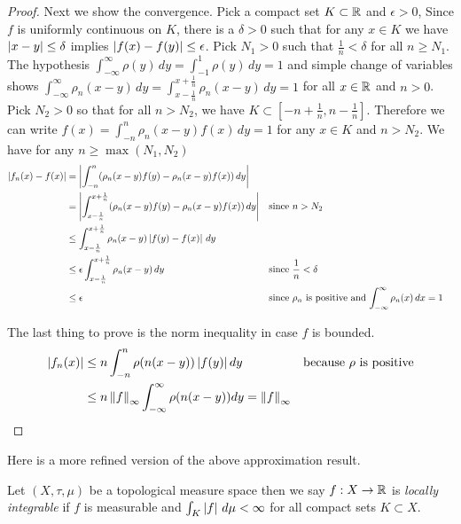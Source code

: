 \begin{proof}
Next we show the convergence.  Pick a compact set $K \subset \mathbb{R}$
and  $\epsilon > 0$,
Since $f$ is uniformly continuous on $K$,  there is a $\delta >0$ such
that for any $x \in K$ we have $\left \vert x - y \right \vert \leq \delta$ implies
$\left \vert f(x) - f(y) \right \vert \leq \epsilon$.  Pick $N_1 > 0$ such that
$\frac{1}{n} < \delta$ for all $n \geq N_1$.  The hypothesis $\int_{-\infty}^\infty
\rho(y) \, dy = \int_{-1}^1
\rho(y) \, dy = 1$ and simple change of variables shows $\int_{-\infty}^\infty
\rho_n(x - y) \, dy = \int_{x - \frac{1}{n}}^{x + \frac{1}{n}}
\rho_n(x - y) \, dy = 1$ for all $x \in \mathbb{R}$ and $n > 0$.  Pick $N_2>0$ so that for all $n > N_2$,
we have $K \subset [-n + \frac{1}{n}, n - \frac{1}{n}]$.  Therefore we can write $f(x) = \int_{- n}^{n}
\rho_n(x - y) f(x)  \, dy = 1$ for any $x \in K$ and $n > N_2$.  We
have for any $n \geq \max(N_1, N_2)$
\begin{align*}
\left \vert f_n(x) - f(x) \right \vert &= \left \vert \int_{- n}^{n} (\rho_n(x -
  y)f(y) -
\rho_n(x- y) f(x)) \, dy \right \vert \\
&= \left \vert \int_{x - \frac{1}{n}}^{x + \frac{1}{n}} (\rho_n(x -
  y)f(y) -
\rho_n(x- y) f(x)) \, dy \right \vert  & & \text{since $n>N_2$}\\
&\leq \int_{x - \frac{1}{n}}^{x + \frac{1}{n}} \rho_n(x- y) \left \vert f(y)
  - f(x) \right \vert \, dy\\
&\leq \epsilon \int_{x -\frac{1}{n}}^{x + \frac{1}{n}} \rho_n(x -  y)
\, dy & &\text{since $\frac{1}{n} < \delta$}\\
&\leq \epsilon & & \text{since $\rho_n$ is positive and
  $\int_{-\infty}^\infty \rho_n(x) \, dx = 1$}
\end{align*}

The last thing to prove is the norm inequality in case $f$ is
bounded.  
\begin{align*}
\left \vert f_n(x) \right \vert &\leq n \int_{-n}^n \rho(n(x - y)) \left \vert  f(y) \right \vert dy & &
\text{because $\rho$ is positive} \\
&\leq n \left \lVert f \right \rVert_\infty \int_{-\infty}^\infty \rho(n(x - y)) dy = \left \lVert f \right \rVert_\infty 
\end{align*}
\end{proof}

Here is a more refined version of the above approximation result.

\begin{defn}Let $(X,\tau, \mu)$ be a topological measure space then we say $f : X \to \mathbb{R}$ is \emph{locally integrable} if 
$f$ is measurable and $\int_K \left \vert f \right \vert \, d\mu < \infty$ for all compact sets $K \subset X$.
\end{defn}

